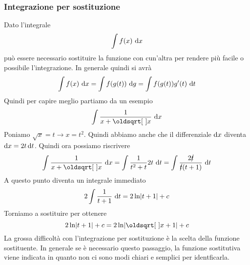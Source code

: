 \subsubsection{Integrazione per sostituzione}
Dato l'integrale
\begin{equation*}
  \int f(x)\,\mathop{}\!\mathrm{d} x
\end{equation*}
può essere necessario sostituire la funzione con cun'altra per rendere più facile o possibile 
l'integrazione. In generale quindi si avrà
\begin{equation*}
  \int f(x)\,\mathop{}\!\mathrm{d} x = \int f(g(t))\,\mathop{}\!\mathrm{d} g = \int f(g(t))g'(t)\,\mathop{}\!\mathrm{d} t
\end{equation*}
Quindi per capire meglio partiamo da un esempio
\begin{equation*}
  \int \frac{1}{x+\sqrt{x}}\,\dif x
\end{equation*}
Poniamo $\sqrt{x}=t \rightarrow x = t^2$. Quindi abbiamo anche che il differenziale $\mathop{}\!\mathrm{d} x$ 
diventa $\mathop{}\!\mathrm{d} x = 2t\mathop{}\!\mathrm{d} t$. Quindi ora possiamo riscrivere
\begin{equation*}
  \int \frac{1}{x+\sqrt{x}}\,\dif x = \int \frac{1}{t^2+t}2t\,\dif t = 
  \int\frac{2\cancel{t}}{\cancel{t}(t+1)}\,\dif t
\end{equation*}
A questo punto diventa un integrale immediato
\begin{equation*}
  2\int \frac{1}{t+1}\,\mathop{}\!\mathrm{d} t = 2\ln\lvert t+1\rvert+c
\end{equation*}
Torniamo a sostituire per ottenere
\begin{equation*}
  2\ln\abs{t+1}+c = 2\ln\abs{\sqrt{x}+1}+c
\end{equation*}
La grossa difficoltà con l'integrazione per sostituzione è la scelta della funzione sostituente.
In generale se è necessario questo passaggio, la funzione sostitutiva viene indicata in quanto non
ci sono modi chiari e semplici per identficarla.
